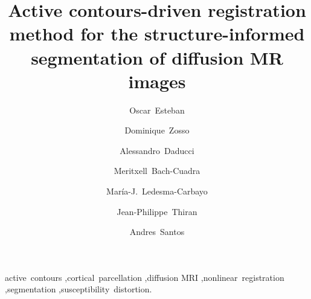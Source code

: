 \documentclass[3p,authoryear,fleqn]{elsarticle}
\begin{document}
\begin{frontmatter}


\title{Active contours-driven registration method for the structure-informed segmentation of diffusion MR images}

\author[bit,ciber]{Oscar~Esteban}
\author[ucla]{Dominique~Zosso}
\author[lts5]{Alessandro~Daducci}
\author[chuv,lts5]{Meritxell~Bach-Cuadra}
\author[bit,ciber]{Mar\'ia-J.~Ledesma-Carbayo}
\author[lts5]{Jean-Philippe~Thiran}
\author[bit,ciber]{Andres~Santos}


\address[bit]{Biomedical Image Technologies (BIT), ETSI Telecomunicaci\'on, Universidad Polit\'ecnica de Madrid, Madrid, Spain}
\address[ciber]{Centro de Investigaci\'on Biom\'edica en Red en Bioingenier\'ia, Biomateriales y Nanomedicina (CIBER-BBN), Spain}
\address[ucla]{Department of Mathematics, University of California,
Los Angeles (UCLA), Los Angeles, CA, US}
\address[lts5]{Signal Processing Laboratory (LTS5), \'Ecole Polytechnique
F\'ed\'erale de Lausanne (EPFL), Lausanne, Switzerland}
\address[chuv]{Dept. of Radiology, CIBM, University
Hospital Center (CHUV) and University of Lausanne (UNIL), Lausanne, Switzerland}


\begin{abstract}

\end{abstract}

\begin{keyword}
active~contours \sep cortical~parcellation \sep diffusion MRI \sep nonlinear~registration \sep segmentation \sep susceptibility~distortion.
\end{keyword}

\end{frontmatter}

\linenumbers











\appendix
{}


%


\end{document}
